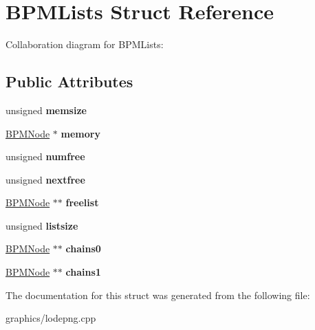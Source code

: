 \hypertarget{struct_b_p_m_lists}{\section{B\+P\+M\+Lists Struct Reference}
\label{struct_b_p_m_lists}
}


Collaboration diagram for B\+P\+M\+Lists\+:
\subsection*{Public Attributes}
\begin{DoxyCompactItemize}
\item 
\hypertarget{struct_b_p_m_lists_a90fa629515809c2d29f13cf1829758fe}{unsigned {\bfseries memsize}}\label{struct_b_p_m_lists_a90fa629515809c2d29f13cf1829758fe}

\item 
\hypertarget{struct_b_p_m_lists_a97ededef0c47fc1911d0e56cf4c8458b}{\hyperlink{struct_b_p_m_node}{B\+P\+M\+Node} $\ast$ {\bfseries memory}}\label{struct_b_p_m_lists_a97ededef0c47fc1911d0e56cf4c8458b}

\item 
\hypertarget{struct_b_p_m_lists_a3d91f7f393d455c28f0172557d050544}{unsigned {\bfseries numfree}}\label{struct_b_p_m_lists_a3d91f7f393d455c28f0172557d050544}

\item 
\hypertarget{struct_b_p_m_lists_a2b4910e1d17b09862e8455fe37f733d9}{unsigned {\bfseries nextfree}}\label{struct_b_p_m_lists_a2b4910e1d17b09862e8455fe37f733d9}

\item 
\hypertarget{struct_b_p_m_lists_a60b8d594291b80d962e9bfedbe90f372}{\hyperlink{struct_b_p_m_node}{B\+P\+M\+Node} $\ast$$\ast$ {\bfseries freelist}}\label{struct_b_p_m_lists_a60b8d594291b80d962e9bfedbe90f372}

\item 
\hypertarget{struct_b_p_m_lists_a3a41279ef589f0365c33d42b044f4864}{unsigned {\bfseries listsize}}\label{struct_b_p_m_lists_a3a41279ef589f0365c33d42b044f4864}

\item 
\hypertarget{struct_b_p_m_lists_ab4a37471c907b02976a672895d7c9ced}{\hyperlink{struct_b_p_m_node}{B\+P\+M\+Node} $\ast$$\ast$ {\bfseries chains0}}\label{struct_b_p_m_lists_ab4a37471c907b02976a672895d7c9ced}

\item 
\hypertarget{struct_b_p_m_lists_a4bd270f4f3d5df206be5a281593f5f76}{\hyperlink{struct_b_p_m_node}{B\+P\+M\+Node} $\ast$$\ast$ {\bfseries chains1}}\label{struct_b_p_m_lists_a4bd270f4f3d5df206be5a281593f5f76}

\end{DoxyCompactItemize}


The documentation for this struct was generated from the following file\+:\begin{DoxyCompactItemize}
\item 
graphics/lodepng.\+cpp\end{DoxyCompactItemize}

